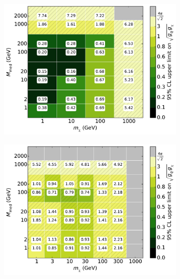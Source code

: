 \begin{figure}[h]
  \centering
    \begin{subfigure}[t]{0.325\textwidth}
      \centering
      \includegraphics[width=1.\textwidth]{figures/grid_basepoints_SVD_rat05_monojet.pdf}
      \caption{}
    \end{subfigure}
    \begin{subfigure}[t]{0.325\textwidth}
      \centering
      \includegraphics[width=1.\textwidth]{figures/grid_allpoints_SVD_rat05.pdf}
      \caption{}
    \end{subfigure}
    \begin{subfigure}[t]{0.325\textwidth}
      \centering

\end{subfigure}
\end{figure}
